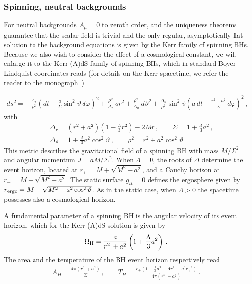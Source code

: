 \documentclass[11pt]{article}
\numberwithin{equation}{section} %
\begin{document}
\subsubsection{Spinning, neutral backgrounds}
For neutral backgrounds $A_{\mu}=0$ to zeroth order, and the uniqueness theorems guarantee that the scalar field is trivial and the only regular,
asymptotically flat solution to the background equations is given by the Kerr family of spinning BHs. Because we also wish to consider the effect of a cosmological constant, we will enlarge it to the Kerr-(A)dS family of spinning BHs,
which in standard Boyer-Lindquist coordinates reads (for details on the Kerr spacetime, we refer the reader to the monograph~\cite{Wiltshire:2009zza})

%
\begin{eqnarray} 
ds^2=-\frac{\Delta_r}{\rho^2}\left ( dt-\frac{a}{\Sigma}\sin^2\vartheta \,d\varphi\right )^2
+\frac{\rho^2}{\Delta_r}\,dr^2
+\frac{\rho^2}{\Delta_{\vartheta}}\,d\vartheta^2
+\frac{\Delta_\vartheta}{\rho^2} \sin^2\vartheta\left (
a\,dt-\frac{r^2+a^2}{\Sigma} \,d\varphi\right )^2 \,, \label{metricKerrLambda}
\end{eqnarray}
%
with
%
\begin{eqnarray}
& & \Delta_r=\left (r^2+a^2\right )\left (1-\frac{\Lambda}{3}{r^2}
\right )-2Mr\,, \qquad  \Sigma=1+\frac{\Lambda}{3}{a^2}\,,\nonumber \\
& &\Delta_{\vartheta}= 1+\frac{\Lambda}{3}{a^2}\cos^2\vartheta\,, \qquad
\rho^2=r^2+a^2 \cos^2\vartheta  \,.  \label{metric parameters}
\end{eqnarray}
%
This metric describes the gravitational field of a spinning BH with mass $M/\Sigma^2$ and angular
momentum $J=a M/\Sigma^2$. When $\Lambda=0$, the roots of $\Delta$ determine the event horizon, located at $r_+=M+\sqrt{M^2-a^2}$, and a Cauchy horizon at $r_-=M-\sqrt{M^2-a^2}$. The static surface $g_{tt}=0$ defines the ergosphere given by $r_{\rm ergo}=M+\sqrt{M^2-a^2\cos^2\vartheta}$.
As in the static case, when $\Lambda>0$ the spacetime possesses also a cosmological horizon.

A fundamental parameter of a spinning BH is the angular velocity of its event horizon, which for the Kerr-(A)dS solution is given by
%
\begin{equation}
\Omega_{\rm H}=\frac{a}{r_+^2+a^2}\left ( 1+\frac{\Lambda}{3}{a^2}\right ) \,.  \label{Omega}
\end{equation}
%
The area and the temperature of the BH event horizon respectively read
%
\begin{eqnarray}
A_H=\frac{4\pi  (r_+^2+a^2)}{\Sigma} \,,\qquad  T_H=\frac{r_+\left(1-\frac{\Lambda}{3} a^2-{\Lambda}r_+^2 -a^2 r_+^{-2}\right)}{4\pi (r_+^2+a^2)}\,.  \label{area_temperature}
\end{eqnarray}
\end{document}
